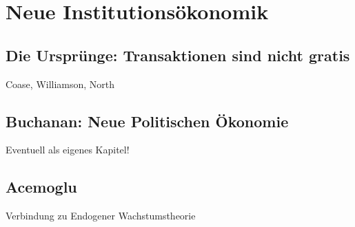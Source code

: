 %
%
%

\chapter{Neue Institutionsökonomik}
\label{Neue Institut}

\section{Die Ursprünge: Transaktionen sind nicht gratis} \label{sec: Neue Inst}
Coase, Williamson, North

\section{Buchanan: Neue Politischen Ökonomie}

Eventuell als eigenes Kapitel!

\section{Acemoglu}
Verbindung zu Endogener Wachstumstheorie